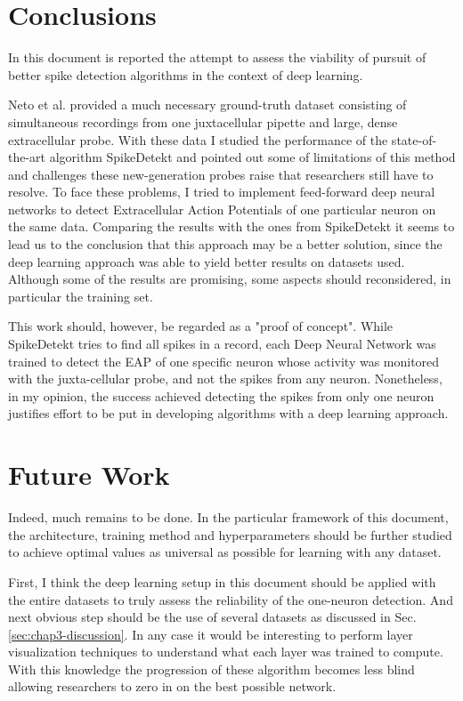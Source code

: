\label{cap:conclusions}

\section{Conclusions}
In this document is reported the attempt to assess the viability of pursuit of better spike detection algorithms in the context of deep learning. 

Neto et al. provided a much necessary ground-truth dataset consisting of simultaneous recordings from one juxtacellular pipette and large, dense extracellular probe. With these data I studied the performance of the state-of-the-art algorithm SpikeDetekt and pointed out some of limitations of this method and challenges these new-generation probes raise that researchers still have to resolve. To face these problems, I tried to implement feed-forward deep neural networks to detect Extracellular Action Potentials of one particular neuron on the same data. Comparing the results with the ones from SpikeDetekt it seems to lead us to the conclusion that this approach may be a better solution, since the deep learning approach was able to yield better results on datasets used. Although some of the results are promising, some aspects should reconsidered, in particular the training set. 

This work should, however, be regarded as a "proof of concept". While SpikeDetekt tries to find all spikes in a record, each Deep Neural Network was trained to detect the EAP of one specific neuron whose activity was monitored with the juxta-cellular probe, and not the spikes from any neuron. Nonetheless, in my opinion, the success achieved detecting the spikes from only one neuron justifies effort to be put in developing algorithms with a deep learning approach.


\section{Future Work}
Indeed, much remains to be done. In the particular framework of this document, the architecture, training method and hyperparameters should be further studied to achieve optimal values as universal as possible for learning with any dataset.

First, I think the deep learning setup in this document should be applied with the entire datasets to truly assess the reliability of the one-neuron detection. And next obvious step should be the use of several datasets as discussed in Sec. \ref{sec:chap3-discussion}. In any case it would be interesting to perform layer visualization techniques to understand what each layer was trained to compute. With this knowledge the progression of these algorithm becomes less blind allowing researchers to zero in on the best possible network.

